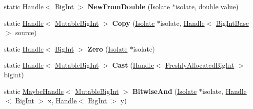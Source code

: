 \begin{DoxyCompactItemize}
static \mbox{\hyperlink{classv8_1_1internal_1_1Handle}{Handle}}$<$ \mbox{\hyperlink{classv8_1_1internal_1_1BigInt}{Big\+Int}} $>$ {\bfseries New\+From\+Double} (\mbox{\hyperlink{classv8_1_1internal_1_1Isolate}{Isolate}} $\ast$isolate, double value)
\item 
\mbox{\label{classv8_1_1internal_1_1MutableBigInt_a53400babf078135c860ef7e95f378a76}} 
static \mbox{\hyperlink{classv8_1_1internal_1_1Handle}{Handle}}$<$ \mbox{\hyperlink{classv8_1_1internal_1_1MutableBigInt}{Mutable\+Big\+Int}} $>$ {\bfseries Copy} (\mbox{\hyperlink{classv8_1_1internal_1_1Isolate}{Isolate}} $\ast$isolate, \mbox{\hyperlink{classv8_1_1internal_1_1Handle}{Handle}}$<$ \mbox{\hyperlink{classv8_1_1internal_1_1BigIntBase}{Big\+Int\+Base}} $>$ source)
\item 
\mbox{\label{classv8_1_1internal_1_1MutableBigInt_abf3e5b072958e62fd9de06134072286a}} 
static \mbox{\hyperlink{classv8_1_1internal_1_1Handle}{Handle}}$<$ \mbox{\hyperlink{classv8_1_1internal_1_1BigInt}{Big\+Int}} $>$ {\bfseries Zero} (\mbox{\hyperlink{classv8_1_1internal_1_1Isolate}{Isolate}} $\ast$isolate)
\item 
\mbox{\label{classv8_1_1internal_1_1MutableBigInt_a8135f6212955b52694961680e19c7a2b}} 
static \mbox{\hyperlink{classv8_1_1internal_1_1Handle}{Handle}}$<$ \mbox{\hyperlink{classv8_1_1internal_1_1MutableBigInt}{Mutable\+Big\+Int}} $>$ {\bfseries Cast} (\mbox{\hyperlink{classv8_1_1internal_1_1Handle}{Handle}}$<$ \mbox{\hyperlink{classv8_1_1internal_1_1FreshlyAllocatedBigInt}{Freshly\+Allocated\+Big\+Int}} $>$ bigint)
\item 
\mbox{\label{classv8_1_1internal_1_1MutableBigInt_ab196e8f03f27221b640265ed4333d8da}} 
static \mbox{\hyperlink{classv8_1_1internal_1_1MaybeHandle}{Maybe\+Handle}}$<$ \mbox{\hyperlink{classv8_1_1internal_1_1MutableBigInt}{Mutable\+Big\+Int}} $>$ {\bfseries Bitwise\+And} (\mbox{\hyperlink{classv8_1_1internal_1_1Isolate}{Isolate}} $\ast$isolate, \mbox{\hyperlink{classv8_1_1internal_1_1Handle}{Handle}}$<$ \mbox{\hyperlink{classv8_1_1internal_1_1BigInt}{Big\+Int}} $>$ x, \mbox{\hyperlink{classv8_1_1internal_1_1Handle}{Handle}}$<$ \mbox{\hyperlink{classv8_1_1internal_1_1BigInt}{Big\+Int}} $>$ y)
\item 

\end{DoxyCompactItemize}

